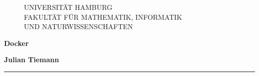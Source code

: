 \begin{titlepage}

  \setcounter{page}{-1}

	\begin{figure}[h]
		UNIVERSITÄT HAMBURG\\
    FAKULTÄT FÜR MATHEMATIK, INFORMATIK \\
    UND NATURWISSENSCHAFTEN

		\vspace{1cm}
	\end{figure}

	\vfill

	\begin{center}
		\vspace{14mm}
		\noindent \textbf{\huge
		  Docker \\
		}
		\vspace{60mm}
	\end{center}

	\vfill

	\noindent \textbf{Julian Tiemann} \\
	\noindent \rule{\textwidth}{0.4mm}
	 \\
	 \\
	 \\

	\newpage
	\thispagestyle{empty}
	\setcounter{page}{0}

\end{titlepage}
